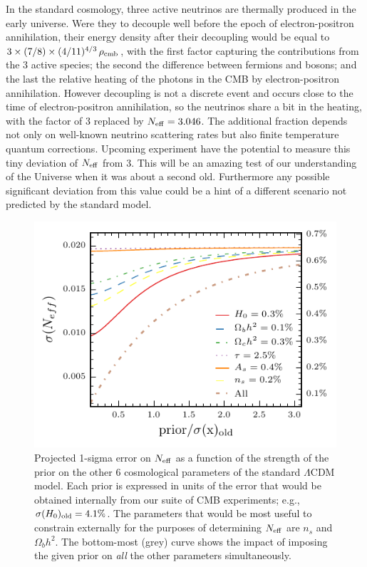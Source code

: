 \documentclass[aps,prd,reprint,superscriptaddress]{revtex4-1}
\begin{document}
In the standard cosmology, three active neutrinos are thermally produced in the early universe. Were they to decouple well before the epoch of electron-positron annihilation, their energy density after their decoupling would be equal to $3\times (7/8)\times (4/11)^{4/3}\,\rho_{\rm cmb}$, with the first factor capturing the contributions from the 3 active species; the second the difference between fermions and bosons; and the last the relative heating of the photons in the CMB by electron-positron annihilation. However decoupling is not a discrete event and occurs close to the time of electron-positron annihilation, so the neutrinos share a bit in the heating, with the factor of 3 replaced by $N_{\rm eff}=3.046$. The additional fraction depends not only on well-known neutrino scattering rates but also finite temperature quantum corrections. 
Upcoming experiment have the potential to measure this tiny deviation of $N_{\rm eff}$ from 3. This will be an amazing test of our understanding of the Universe when it was about a second old.
Furthermore any possible significant deviation from this value could be a hint of a different scenario not predicted by the standard model. 
\begin{figure}[htbp]
\begin{center}
\includegraphics{prior_massless_neutrinos_snow_mass_lmin=4_lmax=4499.pdf}
\caption{Projected 1-sigma error on $N_{\rm eff}$ as a function of the strength of the prior on the other 6 cosmological parameters of the standard $\Lambda$CDM model. Each prior is expressed in units of the error that would be obtained internally from our suite of CMB experiments; e.g., $\sigma(H_0)_{\rm old}=4.1\%$. The parameters that would be most useful to constrain externally for the purposes of determining $N_{\rm eff}$ are $n_s$ and $\Omega_bh^2$. The bottom-most (grey) curve shows the impact of imposing the given prior on {\it all} the other parameters simultaneously.}
\label{fig:prior_massless_neutrinos}
\end{center}
\end{figure}
\end{document}
